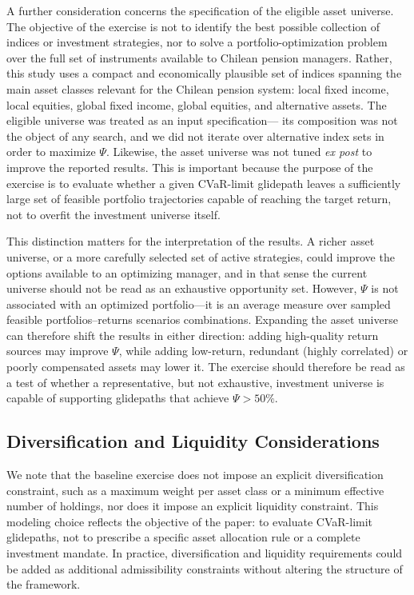 \documentclass[11pt]{article}
\begin{document}
A further consideration concerns the specification of the eligible asset universe. The objective of the exercise is not to identify the best possible collection of indices or investment strategies, nor to solve a portfolio-optimization problem over the full set of instruments available to Chilean pension managers. Rather, this study  uses a compact and economically plausible set of indices spanning the main asset classes relevant for the Chilean pension system: local fixed income, local equities,  global fixed income, global equities, and alternative assets. The eligible universe was treated as an input specification--- its composition was not the object of any search, and we did not iterate over alternative index sets in order to maximize $\Psi$. Likewise, the asset universe was not tuned \textit{ex post} to improve the reported results. This is important because the purpose of the exercise is to evaluate whether a given CVaR-limit glidepath leaves a sufficiently large set of feasible portfolio trajectories capable of reaching the target return, not to overfit the investment universe itself.

This distinction matters for the interpretation of the results. A richer asset universe, or a more carefully selected set of active strategies, could improve the options available to an optimizing manager, and in that sense the current universe should not be read as an exhaustive opportunity set. However, $\Psi$ is not associated with an optimized portfolio---it is an average  measure over sampled feasible portfolios--returns scenarios combinations. Expanding the asset universe can therefore shift the results in either direction: adding high-quality return sources may improve $\Psi$, while adding low-return, redundant (highly correlated)  or poorly compensated assets may lower it. The exercise should therefore be read as a test of whether a representative, but not exhaustive, investment universe is capable of supporting glidepaths that achieve $\Psi > 50\%$.

\subsection{Diversification and Liquidity Considerations}

We note that the baseline exercise does not impose an explicit diversification constraint, such as a maximum weight per asset class or a minimum effective number of holdings, nor does it impose an explicit liquidity constraint. This modeling choice reflects the objective of the paper: to evaluate CVaR-limit glidepaths, not to prescribe a specific asset allocation rule or a complete investment mandate. In practice, diversification and liquidity requirements could be added as additional admissibility constraints without altering the structure of the framework.
\end{document}
